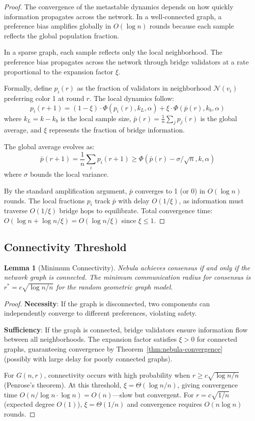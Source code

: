 \documentclass[11pt,a4paper]{article}
\newtheorem{lemma}[theorem]{Lemma}
\begin{document}
\begin{proof}
The convergence of the metastable dynamics depends on how quickly information propagates
across the network. In a well-connected graph, a preference bias amplifies globally in
$O(\log n)$ rounds because each sample reflects the global population fraction.

In a sparse graph, each sample reflects only the local neighborhood. The preference
bias propagates across the network through bridge validators at a rate proportional
to the expansion factor $\xi$.

Formally, define $p_i(r)$ as the fraction of validators in neighborhood $\mathcal{N}(v_i)$
preferring color 1 at round $r$. The local dynamics follow:
\[
p_i(r+1) = (1 - \xi) \cdot \Phi(p_i(r), k_L, \alpha) + \xi \cdot \Phi(\bar{p}(r), k_b, \alpha)
\]
where $k_L = k - k_b$ is the local sample size, $\bar{p}(r) = \frac{1}{n}\sum_j p_j(r)$
is the global average, and $\xi$ represents the fraction of bridge information.

The global average evolves as:
\[
\bar{p}(r+1) = \frac{1}{n} \sum_i p_i(r+1) \geq \Phi(\bar{p}(r) - \sigma/\sqrt{n}, k, \alpha)
\]
where $\sigma$ bounds the local variance.

By the standard amplification argument, $\bar{p}$ converges to 1 (or 0) in $O(\log n)$
rounds. The local fractions $p_i$ track $\bar{p}$ with delay $O(1/\xi)$, as information
must traverse $O(1/\xi)$ bridge hops to equilibrate. Total convergence time:
$O(\log n + \log n / \xi) = O(\log n / \xi)$ since $\xi \leq 1$.
\end{proof}

\subsection{Connectivity Threshold}

\begin{lemma}[Minimum Connectivity]
\label{lem:connectivity}
Nebula achieves consensus if and only if the network graph is connected. The minimum
communication radius for consensus is $r^* = c\sqrt{\log n / n}$ for the random
geometric graph model.
\end{lemma}

\begin{proof}
\textbf{Necessity}: If the graph is disconnected, two components can independently
converge to different preferences, violating safety.

\textbf{Sufficiency}: If the graph is connected, bridge validators ensure information
flow between all neighborhoods. The expansion factor satisfies $\xi > 0$ for connected
graphs, guaranteeing convergence by Theorem~\ref{thm:nebula-convergence} (possibly with
large delay for poorly connected graphs).

For $G(n, r)$, connectivity occurs with high probability when $r \geq c\sqrt{\log n / n}$
(Penrose's theorem). At this threshold, $\xi = \Theta(\log n / n)$, giving convergence
time $O(n / \log n \cdot \log n) = O(n)$---slow but convergent. For $r = c\sqrt{1/n}$
(expected degree $O(1)$), $\xi = \Theta(1/n)$ and convergence requires $O(n \log n)$ rounds.
\end{proof}
\end{document}
